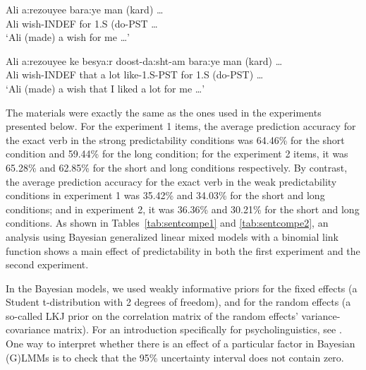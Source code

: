\documentclass{frontiersSCNS}\usepackage{knitr} %
\begin{document}
\begin{exe}
\ex \label{examplecontinuations}
\begin{xlist}
\item 
\gll Ali a:rezouyee bara:ye man (kard) \dots \\
     Ali wish-INDEF for 1.S (do-PST \dots \\
\glt    `Ali (made) a wish for me \dots ' \\

\item 
\gll Ali a:rezouyee ke besya:r doost-da:sht-am bara:ye man (kard) \dots \\
      Ali wish-INDEF that {a lot} like-1.S-PST for 1.S (do-PST) \dots \\
\glt `Ali (made) a wish that I liked a lot for me \dots' \\
\end{xlist}
\end{exe}






The materials were exactly the same as the ones used in the experiments presented below. For the experiment 1 items, the average prediction accuracy for the exact verb in the strong predictability conditions was 
64.46\%
for the short condition and 
59.44\%
for the long condition; for the experiment 2 items, it was 
65.28\%
and 
62.85\%
for the short and long conditions respectively. By contrast, the average prediction accuracy for the exact verb in the weak predictability conditions in experiment 1 was 
35.42\%
and 
34.03\%
for the short and long conditions; and in experiment 2, it was 
36.36\%
and 
30.21\%
for the short and long conditions. 
As shown in Tables~\ref{tab:sentcompe1} and \ref{tab:sentcompe2}, an analysis using Bayesian generalized linear mixed models with a binomial link function shows a main effect of predictability in both the first experiment
and the second experiment. 

In the Bayesian models, we used weakly informative priors
for the fixed effects (a Student t-distribution with 2 degrees of freedom), and for the random effects (a so-called LKJ prior on the correlation matrix of the random effects' variance-covariance matrix). For an introduction specifically for psycholinguistics, see \citealp{SorensenVasishthTutorial,NicenboimVasishthStatMeth}.
One way to interpret whether there is an effect of a particular factor in Bayesian (G)LMMs is to check that the 95\% uncertainty interval does not contain zero.
\end{document}
